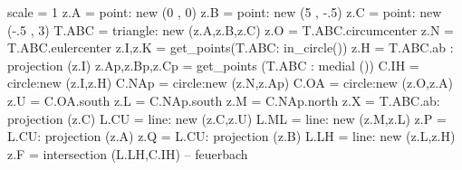\begin{minipage}[t]{.5\textwidth}\vspace{0pt}%
\begin{tkzelements}
scale  =  1
z.A    = point: new (0 , 0)
z.B    = point: new (5 , -.5)
z.C    = point: new (-.5 , 3)
T.ABC  = triangle: new (z.A,z.B,z.C)
z.O    = T.ABC.circumcenter
z.N    = T.ABC.eulercenter
z.I,z.K    = get_points(T.ABC: in_circle())
z.H = T.ABC.ab : projection (z.I)
z.Ap,z.Bp,z.Cp = get_points (T.ABC : medial ())
C.IH   = circle:new (z.I,z.H)
C.NAp  = circle:new (z.N,z.Ap)
C.OA   = circle:new (z.O,z.A)
z.U    = C.OA.south
z.L    = C.NAp.south
z.M    = C.NAp.north
z.X    = T.ABC.ab: projection (z.C)
L.CU   = line: new (z.C,z.U)
L.ML   = line: new (z.M,z.L)
z.P    = L.CU: projection (z.A)
z.Q    = L.CU: projection (z.B)
L.LH   = line: new (z.L,z.H)
z.F  = intersection (L.LH,C.IH) -- feuerbach
\end{tkzelements}

\begin{center}
\end{center}
   
\end{minipage}

